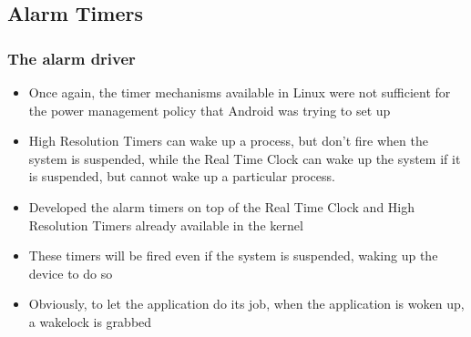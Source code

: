 \subsection{Alarm Timers}
\begin{frame}
  \frametitle{The alarm driver}
  \begin{itemize}
  \item Once again, the timer mechanisms available in Linux were not
    sufficient for the power management policy that Android was trying to
    set up
  \item High Resolution Timers can wake up a process, but don't fire
    when the system is suspended, while the Real Time Clock can wake up
    the system if it is suspended, but cannot wake up a particular
    process.
  \item Developed the alarm timers on top of the Real Time Clock and
    High Resolution Timers already available in the kernel
  \item These timers will be fired even if the system is suspended,
    waking up the device to do so
  \item Obviously, to let the application do its job, when the
    application is woken up, a wakelock is grabbed
  \end{itemize}
\end{frame}
